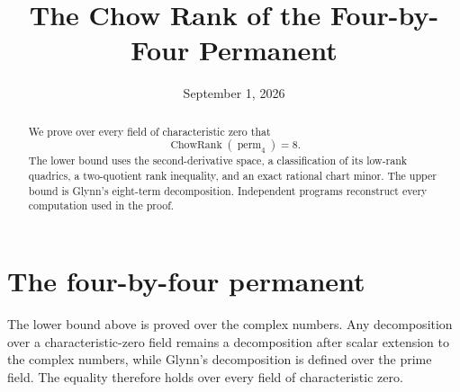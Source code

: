 \documentclass[10pt,a4paper,reqno]{amsart}
\title{The Chow Rank of the Four-by-Four Permanent}
\author{}
\date{September 1, 2026}
\theoremstyle{definition}
\newcommand{\ChowRank}{\operatorname{ChowRank}}
\newcommand{\perm}{\operatorname{perm}}
\begin{document}
\begin{abstract}
We prove over every field of characteristic zero that
\[
  \ChowRank(\perm_4)=8.
\]
The lower bound uses the second-derivative space, a classification of its
low-rank quadrics, a two-quotient rank inequality, and an exact rational chart
minor. The upper bound is Glynn's eight-term decomposition. Independent
programs reconstruct every computation used in the proof.
\end{abstract}
\maketitle

\section{The four-by-four permanent}


The lower bound above is proved over the complex numbers. Any decomposition
over a characteristic-zero field remains a decomposition after scalar
extension to the complex numbers, while Glynn's decomposition is defined over
the prime field. The equality therefore holds over every field of
characteristic zero.
\end{document}
